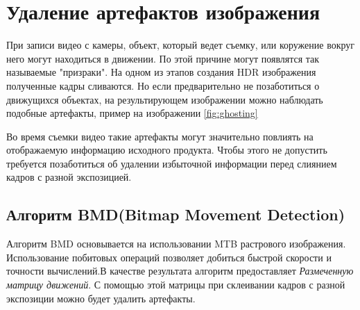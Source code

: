 \section {Удаление артефактов изображения}

При записи видео с камеры, объект, который ведет съемку, или коружение вокруг него могут находиться в движении. По этой причине могут появлятся так называемые "призраки". На одном из этапов создания HDR изображения полученные кадры сливаются. Но если предварительно не позаботиться о движущихся объектах, на результирующем изображении можно наблюдать подобные артефакты, пример на изображении \ref{fig:ghosting}

\begin{figure}[ht!]
\end{figure}

Во время съемки видео такие артефакты могут значительно повлиять на отображаемую информацию исходного продукта. Чтобы этого не допустить требуется позаботиться об удалении избыточной информации перед слиянием кадров с разной экспозицией.

\subsection { Алгоритм BMD(Bitmap Movement Detection)}

Алгоритм BMD основывается на использовании MTB растрового изображения. Использование побитовых операций позволяет добиться быстрой скорости и точности вычислений.В качестве результата алгоритм предоставляет \textit{ Размеченную матрицу движений}. С помощью этой матрицы при склеивании кадров с разной экспозиции можно будет удалить артефакты.

